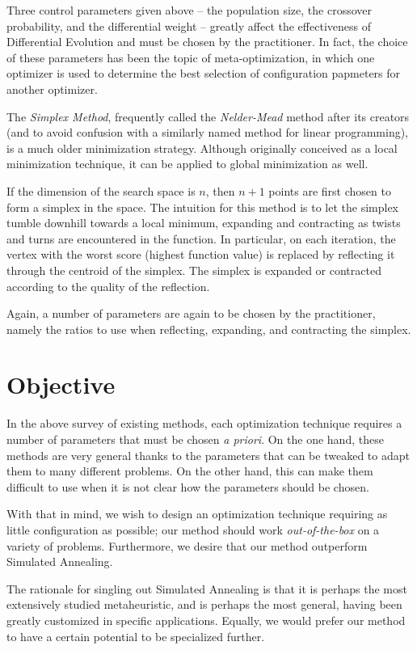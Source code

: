 \documentclass[12pt]{article}
\begin{document}
Three control parameters given above -- the population size, the crossover
probability, and the differential weight -- greatly affect the effectiveness of
Differential Evolution and must be chosen by the practitioner\cite{storn1997}.
In fact, the choice of these parameters has been the topic of
meta-optimization\cite{pedersen2010}, in which one optimizer is used to
determine the best selection of configuration papmeters for another optimizer.

The \emph{Simplex Method}\cite{nelder1965}, frequently called the
\emph{Nelder-Mead} method after its creators (and to avoid confusion with a
similarly named method for linear programming), is a much older
minimization strategy. Although originally conceived as a local
minimization technique, it can be applied to global minimization as well.

If the dimension of the search space is $n$, then $n+1$ points are first
chosen to form a simplex in the space. The intuition for this method is to
let the simplex tumble downhill towards a local minimum, expanding and
contracting as twists and turns are encountered in the function. In
particular, on each iteration, the vertex with the worst score (highest
function value) is replaced by reflecting it through the centroid of the
simplex. The simplex is expanded or contracted according to the quality of the
reflection.

Again, a number of parameters are again to be chosen by the practitioner,
namely the ratios to use when reflecting, expanding, and contracting the
simplex.


\section{Objective}

In the above survey of existing methods, each optimization technique
requires a number of parameters that must be chosen \emph{a priori}. On the
one hand, these methods are very general thanks to the parameters that can
be tweaked to adapt them to many different problems. On the other hand,
this can make them difficult to use when it is not clear how the parameters
should be chosen.

With that in mind, we wish to design an optimization technique
requiring as little configuration as possible; our method should work
\emph{out-of-the-box} on a variety of problems. Furthermore, we desire
that our method outperform Simulated Annealing.

The rationale for singling out Simulated Annealing is that it is perhaps the
most extensively studied metaheuristic, and is perhaps the most general, having
been greatly customized in specific applications. Equally, we would prefer our
method to have a certain potential to be specialized further.
\end{document}
